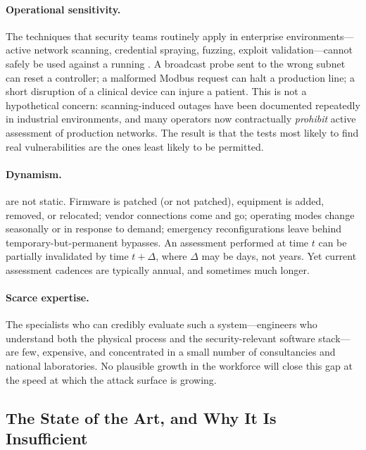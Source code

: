 \paragraph{Operational sensitivity.}
The techniques that security teams routinely apply in enterprise
environments---active network scanning, credential spraying, fuzzing,
exploit validation---cannot safely be used against a running \cps. A
broadcast probe sent to the wrong subnet can reset a controller; a
malformed Modbus request can halt a production line; a short disruption
of a clinical device can injure a patient. This is not a hypothetical
concern: scanning-induced outages have been documented repeatedly in
industrial environments, and many operators now contractually
\emph{prohibit} active assessment of production networks. The result
is that the tests most likely to find real vulnerabilities are the ones
least likely to be permitted.

\paragraph{Dynamism.}
\CPSs are not static. Firmware is patched (or not patched), equipment is
added, removed, or relocated; vendor connections come and go; operating
modes change seasonally or in response to demand; emergency
reconfigurations leave behind temporary-but-permanent bypasses. An
assessment performed at time $t$ can be partially invalidated by time
$t + \Delta$, where $\Delta$ may be days, not years. Yet current
assessment cadences are typically annual, and sometimes much longer.

\paragraph{Scarce expertise.}
The specialists who can credibly evaluate such a system---engineers who
understand both the physical process and the security-relevant software
stack---are few, expensive, and concentrated in a small number of
consultancies and national laboratories. No plausible growth in the
workforce will close this gap at the speed at which the attack surface
is growing.

\subsection{The State of the Art, and Why It Is Insufficient}
\label{sec:intro-sota}

